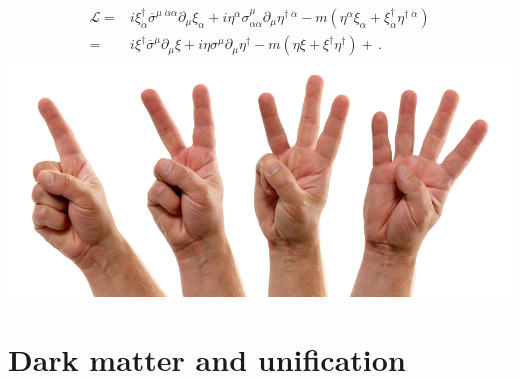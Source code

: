 \documentclass[%
xcolor=dvipsnames,table%
]{beamer}
\begin{document}
\begin{frame}
\begin{align*}
  \mathcal{L}=&i\xi^{\dagger}_{\dot{\alpha}}\overline{\sigma}^{\mu\;\dot{\alpha}\alpha}\partial_{\mu}\xi_{\alpha}+i\eta^{\alpha}\sigma^{\mu}_{\alpha\dot{\alpha}}\partial_{\mu}\eta^{\dagger\;\dot{\alpha}}
-m \left(\eta^{\alpha} \xi_{\alpha}+\xi^{\dagger}_{\dot{\alpha}} \eta^{\dagger\;\dot{\alpha}}\right)\nonumber\\
=&i\xi^{\dagger}\overline{\sigma}^{\mu}\partial_{\mu}\xi+i\eta\sigma^{\mu}\partial_{\mu}\eta^{\dagger}
-m \left(\eta\xi+\xi^{\dagger}\eta^{\dagger} \right)+\,.
\end{align*}
\centering
\includegraphics[scale=0.13]{counting-1-to-4}
\end{frame}


\section{Dark matter and unification}
\end{document}
